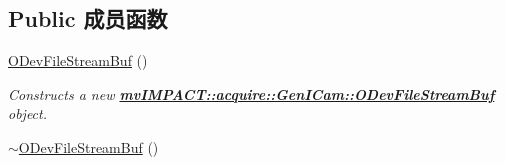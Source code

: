 \subsection*{Public 成员函数}
\begin{DoxyCompactItemize}
\item 
\hypertarget{classmv_i_m_p_a_c_t_1_1acquire_1_1_gen_i_cam_1_1_o_dev_file_stream_buf_a20d6928c14478b475109f079baf0ecb0}{\hyperlink{classmv_i_m_p_a_c_t_1_1acquire_1_1_gen_i_cam_1_1_o_dev_file_stream_buf_a20d6928c14478b475109f079baf0ecb0}{O\+Dev\+File\+Stream\+Buf} ()}\label{classmv_i_m_p_a_c_t_1_1acquire_1_1_gen_i_cam_1_1_o_dev_file_stream_buf_a20d6928c14478b475109f079baf0ecb0}

\begin{DoxyCompactList}\small\item\em Constructs a new {\bfseries \hyperlink{classmv_i_m_p_a_c_t_1_1acquire_1_1_gen_i_cam_1_1_o_dev_file_stream_buf}{mv\+I\+M\+P\+A\+C\+T\+::acquire\+::\+Gen\+I\+Cam\+::\+O\+Dev\+File\+Stream\+Buf}} object. \end{DoxyCompactList}\item 
\hypertarget{classmv_i_m_p_a_c_t_1_1acquire_1_1_gen_i_cam_1_1_o_dev_file_stream_buf_a96a881b88fe2df12b9a218dcebfd15c4}{\hyperlink{classmv_i_m_p_a_c_t_1_1acquire_1_1_gen_i_cam_1_1_o_dev_file_stream_buf_a96a881b88fe2df12b9a218dcebfd15c4}{$\sim$\+O\+Dev\+File\+Stream\+Buf} ()}\label{classmv_i_m_p_a_c_t_1_1acquire_1_1_gen_i_cam_1_1_o_dev_file_stream_buf_a96a881b88fe2df12b9a218dcebfd15c4}


\end{DoxyCompactItemize}

